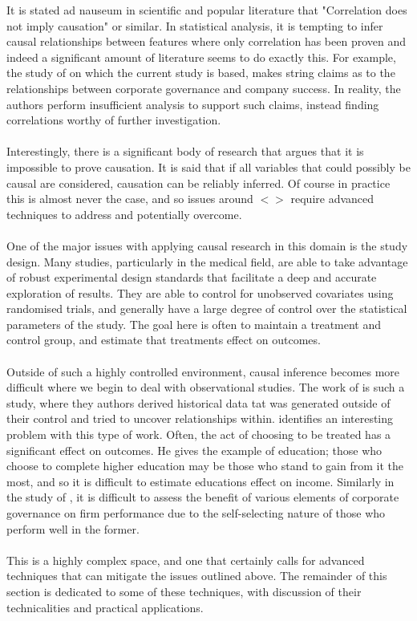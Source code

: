 {It is stated ad nauseum in scientific and popular literature that "Correlation does not imply causation" or similar. In statistical analysis, it is tempting to infer causal relationships between features where only correlation has been proven and indeed a significant amount of literature seems to do exactly this. For example, the study of \cite{moldovan2015learning} on which the current study is based, makes string claims as to the relationships between corporate governance and company success. In reality, the authors perform insufficient analysis to support such claims, instead finding correlations worthy of further investigation. \\\\
Interestingly, there is a significant body of research that argues that it is impossible to prove causation. It is said that if all variables that could possibly be causal are considered, causation can be reliably inferred. Of course in practice this is almost never the case, and so issues around $<>$ require advanced techniques to address and potentially overcome.     \\\\
One of the major issues with applying causal research in this domain is the study design. Many studies, particularly in the medical field, are able to take advantage of robust experimental design standards that facilitate a deep and accurate exploration of results. They are able to control for unobserved covariates using randomised trials, and generally have a large degree of control over the statistical parameters of the study. The goal here is often to maintain a treatment and control group, and estimate that treatments effect on outcomes.  \\\\
Outside of such a highly controlled environment, causal inference becomes more difficult where we begin to deal with observational studies. The work of \cite{moldovan2015learning} is such a study, where they authors derived historical data tat was generated outside of their control and tried to uncover relationships within. \cite{esarey2015causal} identifies an interesting problem with this type of work. Often, the act of choosing to be treated has a significant effect on outcomes. He gives the example of education; those who choose to complete higher education may be those who stand to gain from it the most, and so it is difficult to estimate educations effect on income. Similarly in the study of \cite{moldovan2015learning}, it is difficult to assess the benefit of various elements of corporate governance on firm performance due to the self-selecting nature of those who perform well in the former. \\\\
This is a highly complex space, and one that certainly calls for advanced techniques that can mitigate the issues outlined above. The remainder of this section is dedicated to some of these techniques, with discussion of their technicalities and practical applications.  }

